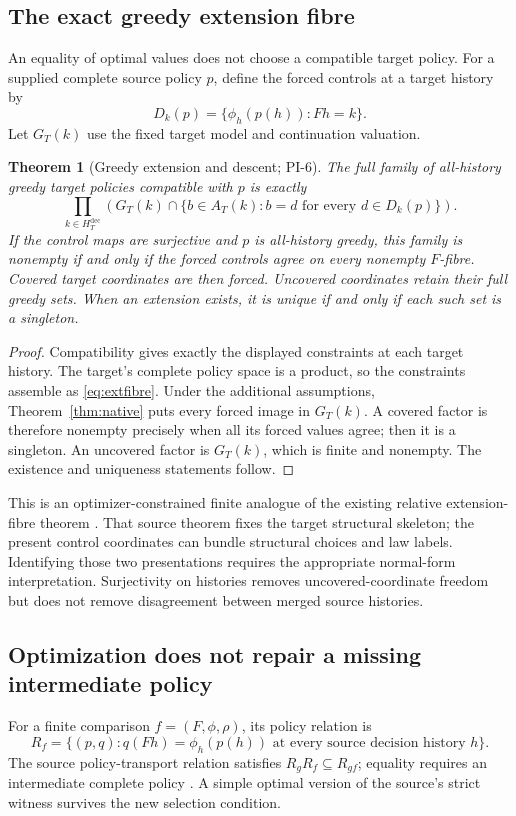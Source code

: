 \documentclass[11pt]{article}
\newtheorem{theorem}{Theorem}[section]
\theoremstyle{definition}
\begin{document}
\subsection{The exact greedy extension fibre}
\label{sec:fibre}
An equality of optimal values does not choose a compatible target policy.
For a supplied complete source policy \(p\), define the forced controls at
a target history by
\[
 D_k(p)=\{\phi_h(p(h)):Fh=k\}.
\]
Let \(G_T(k)\) use the fixed target model and continuation valuation.

\begin{theorem}[Greedy extension and descent; PI-6]
\label{thm:fibre}
The full family of all-history greedy target policies compatible with \(p\)
is exactly
\begin{equation}
 \prod_{k\in H_T^{\mathrm{dec}}}
 \left(
 G_T(k)\cap
 \{b\in A_T(k): b=d\text{ for every }d\in D_k(p)\}
 \right).
 \label{eq:extfibre}
\end{equation}
If the control maps are surjective and \(p\) is all-history greedy, this
family is nonempty if and only if the forced controls agree on every
nonempty \(F\)-fibre. Covered target coordinates are then forced.
Uncovered coordinates retain their full greedy sets. When an extension
exists, it is unique if and only if each such set is a singleton.
\end{theorem}
\begin{proof}
Compatibility gives exactly the displayed constraints at each target
history. The target's complete policy space is a product, so the constraints
assemble as \eqref{eq:extfibre}. Under the additional assumptions,
Theorem~\ref{thm:native} puts every forced image in \(G_T(k)\). A covered
factor is therefore nonempty precisely when all its forced values agree;
then it is a singleton. An uncovered factor is \(G_T(k)\), which is finite
and nonempty. The existence and uniqueness statements follow.
\end{proof}

This is an optimizer-constrained finite analogue of the existing relative
extension-fibre theorem \cite{conditional}. That source theorem fixes the
target structural skeleton; the present control coordinates can bundle
structural choices and law labels. Identifying those two presentations
requires the appropriate normal-form interpretation.
Surjectivity on histories removes uncovered-coordinate freedom but
does not remove disagreement between merged source histories.

\subsection{Optimization does not repair a missing intermediate policy}
\label{sec:middle}
For a finite comparison \(f=(F,\phi,\rho)\), its policy relation is
\[
 R_f=\{(p,q):q(Fh)=\phi_h(p(h))\text{ at every source decision history }h\}.
\]
The source policy-transport relation satisfies
\(R_gR_f\subseteq R_{gf}\); equality requires an intermediate complete
policy \cite{transport}. A simple optimal version of the source's strict
witness survives the new selection condition.
\end{document}
